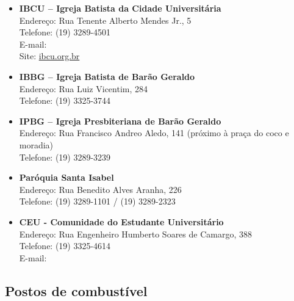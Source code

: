 \begin{itemize}
    \item   \textbf{IBCU -- Igreja Batista da Cidade Universitária}
        \\Endereço: Rua Tenente Alberto Mendes Jr., 5
        \\Telefone: (19) 3289-4501
        \\E-mail: 
        \\Site: \url{ibcu.org.br}

    \item   \textbf{IBBG -- Igreja Batista de Barão Geraldo}
        \\Endereço: Rua Luiz Vicentim, 284
        \\Telefone: (19) 3325-3744

    \item   \textbf{IPBG -- Igreja Presbiteriana de Barão Geraldo}
        \\Endereço: Rua Francisco Andreo Aledo, 141 (próximo à praça do coco e
        moradia)
        \\Telefone: (19) 3289-3239

    \item   \textbf{Paróquia Santa Isabel}
        \\Endereço: Rua Benedito Alves Aranha, 226
        \\Telefone: (19) 3289-1101 / (19) 3289-2323

    \item   \textbf{CEU - Comunidade do Estudante Universitário}
        \\Endereço: Rua Engenheiro Humberto Soares de Camargo, 388
        \\Telefone: (19) 3325-4614
        \\E-mail: 
\end{itemize}

\subsection{Postos de combustível}

